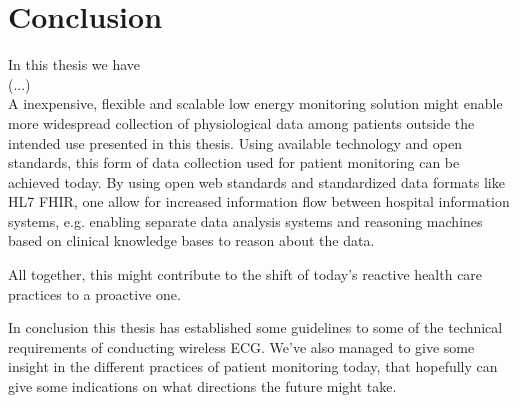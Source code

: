 \section{Conclusion} %
\label{sec:conclusion}

In this thesis we have 
\\
\newline
(...)
\\
\newline
A inexpensive, flexible and scalable low energy monitoring solution might enable more widespread collection of physiological data among patients outside the intended use presented in this thesis. Using available technology and open standards, this form of data collection used for patient monitoring can be achieved today. By using open web standards and standardized data formats like HL7 FHIR, one allow for increased information flow between hospital information systems, e.g. enabling separate data analysis systems and reasoning machines based on clinical knowledge bases to reason about the data. 

All together, this might contribute to the shift of today's reactive health care practices to a proactive one.

In conclusion this thesis has established some guidelines to some of the technical requirements of conducting wireless ECG. We've also managed to give some insight in the different practices of patient monitoring today, that hopefully can give some indications on what directions the future might take.

